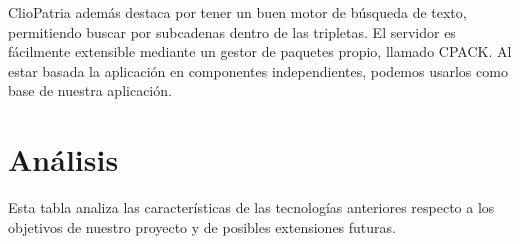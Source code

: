 \documentclass[openright,twoside,12pt]{book}
\begin{document}
ClioPatria además destaca por tener un buen motor de búsqueda de texto, permitiendo buscar por subcadenas dentro de las tripletas. El servidor es fácilmente extensible mediante un gestor de paquetes propio, llamado CPACK. Al estar basada la aplicación en componentes independientes, podemos usarlos como base de nuestra aplicación.

\section{Análisis}

Esta tabla analiza las características de las tecnologías anteriores respecto a los objetivos de nuestro proyecto y de posibles extensiones futuras.


\begin{table}[ht]
    \caption{Comparativa de características entre diferente software}
    \label{table:comparativa}
\end{table}
\end{document}
